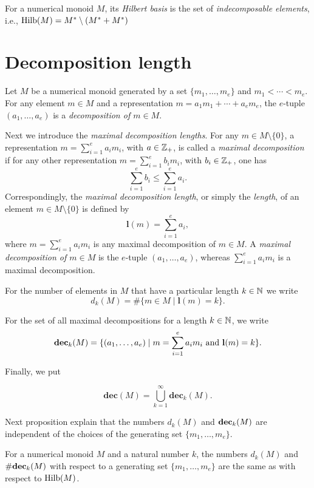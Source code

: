 \begin{definition}\label{Hilbert_basis}
For a numerical monoid $M$, its \emph{Hilbert basis} is the set of \emph{indecomposable elements}, i.e., $\operatorname{Hilb}(M)=M^*\setminus(M^*+M^*)$
\end{definition}

\section{Decomposition length}\label{Decomposition_length}

Let $M$ be a numerical monoid generated by a set $\{m_1, \ldots, m_e\}$ and $m_1 < \cdots < m_e$. For any element $m \in M$ and a representation
$m = a_1m_1 + \cdots + a_em_e$, the $e$-tuple $(a_1, \ldots, a_e)$ is a \textit{decomposition of $m \in M$}.

Next we introduce the \emph{maximal decomposition lengths}. For any $m \in M \setminus \{0\}$, a representation $m = \sum_{i = 1}^{e}a_im_i$, with $a \in \mathbb{Z}_+$, is called a \textit{maximal decomposition} if for any other representation $m = \sum_{i = 1}^{e} b_im_i$, with $b_i \in \mathbb{Z}_+$, one has
\[
  \sum_{i = 1}^{e}b_i \leq \sum_{i = 1}^{e} a_i.
\]
Correspondingly, the \emph{maximal decomposition length}, or simply the \textit{length}, of an element $m \in M \setminus \{0\}$ is defined by
\[
  \textbf{l}(m) = \sum_{i = 1}^{e} a_i,
\]
where $m = \sum_{i = 1}^{e}a_im_i$ is any maximal decomposition of $m \in M$. A \textit{maximal decomposition of $m \in M$} is the $e$-tuple $(a_1, \ldots, a_e)$, whereas $\sum_{i = 1}^{e} a_im_i$ is a maximal decomposition. 

For the number of elements in $M$ that have a particular length $k \in \mathbb{N}$ we write
\[
  d_k(M) = \#\{m \in M \mid \textbf{l}(m) = k\}.
\]

For the set of all maximal decompositions for a length $k \in \mathbb{N}$, we write
\[
  \textbf{dec}_k (M) = \{(a_1, \ldots, a_e) \mid m  = \sum_{i = 1}^{e} a_im_i\ \text{and}\ \textbf{l}(m) = k\}.
\]

Finally, we put

\[
  \textbf{dec}(M) = \bigcup_{k = 1}^{\infty} \textbf{dec}_{k}(M).
\]

Next proposition explain that the numbers $d_k(M)$ and $\textbf{dec}_k(M)$ are independent of the choices of the generating set $\{m_1,\ldots,m_e\}$.

\begin{proposition}\label{Invariant}
For a numerical monoid $M$ and a natural number $k$, the numbers $d_k(M)$ and $\#\textbf{dec}_k(M)$ with respect to a generating set $\{m_1,\ldots,m_e\}$ are the same as with respect to $\operatorname{Hilb}(M)$.
\end{proposition}

